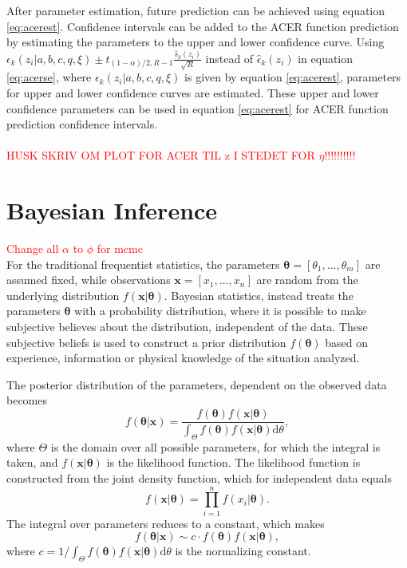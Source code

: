 After parameter estimation, future prediction can be achieved using equation \eqref{eq:acerest}. Confidence intervals can be added to the ACER function prediction by estimating the parameters to the upper and lower confidence curve. Using $\epsilon_{k}(z_i|a,b,c,q,\xi) \pm t_{(1-\alpha)/2,R-1} \frac{\hat{s}_k(z_i)}{\sqrt{R}}$ instead of $\hat{\epsilon}_k(z_i)$ in equation \eqref{eq:acerse}, where $\epsilon_{k}(z_i|a,b,c,q,\xi)$ is given by equation \eqref{eq:acerest}, parameters for upper and lower confidence curves are estimated. These upper and lower confidence parameters can be used in equation \eqref{eq:acerest} for ACER function prediction confidence intervals.
\\ \\
\textcolor{red}{HUSK SKRIV OM PLOT FOR ACER TIL z I STEDET FOR $\eta$!!!!!!!!!!}


\section{Bayesian Inference}
\label{ch:BayesianInference}
\textcolor{red}{Change all $\alpha$ to $\phi$ for mcmc}\\
For the traditional frequentist statistics, the parameters $\boldsymbol{\theta}=[\theta_1,\dots,\theta_m]$ are assumed fixed, while observations $\boldsymbol{x}=[x_1,\dots,x_n]$ are random from the underlying distribution $f(\boldsymbol{x}| \boldsymbol{\theta})$. Bayesian statistics, instead treats the parameters $\boldsymbol{\theta}$ with a probability distribution, where it is possible to make subjective believes about the distribution, independent of the data. These subjective beliefs is used to construct a prior distribution $f(\boldsymbol{\theta})$ based on experience, information or physical knowledge of the situation analyzed. 

The posterior distribution of the parameters, dependent on the observed data becomes 
\begin{equation}
f(\boldsymbol{\theta}|\boldsymbol{x})=\frac{f(\boldsymbol{\theta})f(\boldsymbol{x}|\boldsymbol{\theta})}{\int_{\Theta} f(\boldsymbol{\theta})f(\boldsymbol{x}|\boldsymbol{\theta}) \mathrm{d} \theta}, 
\end{equation}
where $\Theta$ is the domain over all possible parameters, for which the integral is taken, and  $f(\boldsymbol{x}|\boldsymbol{\theta})$ is the likelihood function. The likelihood function is constructed from the joint density function, which for independent data equals
\begin{equation}
\label{eq:jointdens}
f(\boldsymbol{x}|\boldsymbol{\theta})=\prod_{i=1}^{n} f(x_i|\boldsymbol{\theta}).
\end{equation}
The integral over parameters reduces to a constant, which makes
\begin{equation}
f(\boldsymbol{\theta}|\boldsymbol{x}) \sim c \cdot f(\boldsymbol{\theta})f(\boldsymbol{x}|\boldsymbol{\theta}), \label{eq:genposteriorc}
\end{equation}
where $c=1/ \int_{\Theta} f(\boldsymbol{\theta})f(\boldsymbol{x}|\boldsymbol{\theta}) \mathrm{d} \theta$ is the normalizing constant.

